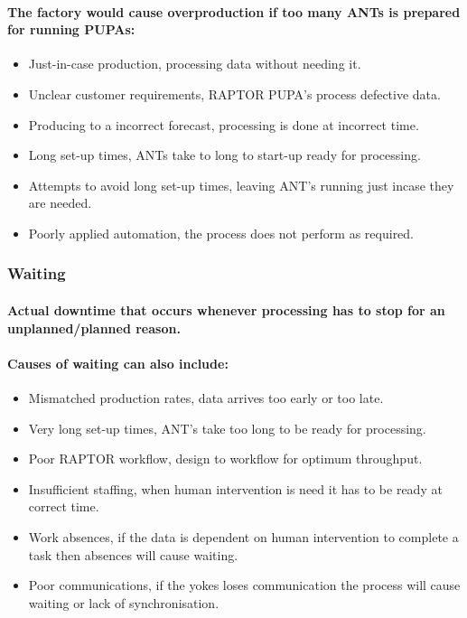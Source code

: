 \documentclass{acm_proc_article-sp}
\begin{document}
\paragraph{The factory would cause overproduction if too many ANTs is prepared for running PUPAs:}
\begin{itemize}
\item Just-in-case production, processing data without needing it.
\item Unclear customer requirements, RAPTOR PUPA's process defective data.
\item Producing to a incorrect forecast, processing is done at incorrect time.
\item Long set-up times, ANTs take to long to start-up ready for processing.
\item Attempts to avoid long set-up times, leaving ANT's running just incase they are needed.
\item Poorly applied automation, the process does not perform as required. 
\end{itemize}
\subsubsection{Waiting}
\paragraph{Actual downtime that occurs whenever processing has to stop for an unplanned/planned reason.}
\paragraph{Causes of waiting can also include:}
\begin{itemize}
\item Mismatched production rates, data arrives too early or too late.
\item Very long set-up times, ANT's take too long to be ready for processing.
\item Poor RAPTOR workflow, design to workflow for optimum throughput.
\item Insufficient staffing, when human intervention is need it has to be ready at correct time.
\item Work absences, if the data is dependent on human intervention to complete a task then absences will cause waiting.
\item Poor communications, if the yokes loses communication the process will cause waiting or lack of synchronisation.
\end{itemize}
\end{document}
